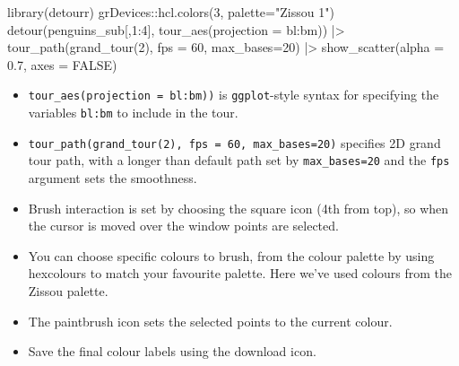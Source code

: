 \documentclass[
  letterpaper,
]{krantz}
\newenvironment{Shaded}{\begin{snugshade}}{\end{snugshade}}
\newcommand{\AttributeTok}[1]{\textcolor[rgb]{0.40,0.45,0.13}{#1}}
\newcommand{\ConstantTok}[1]{\textcolor[rgb]{0.56,0.35,0.01}{#1}}
\newcommand{\DecValTok}[1]{\textcolor[rgb]{0.68,0.00,0.00}{#1}}
\newcommand{\FloatTok}[1]{\textcolor[rgb]{0.68,0.00,0.00}{#1}}
\newcommand{\FunctionTok}[1]{\textcolor[rgb]{0.28,0.35,0.67}{#1}}
\newcommand{\NormalTok}[1]{\textcolor[rgb]{0.00,0.23,0.31}{#1}}
\newcommand{\SpecialCharTok}[1]{\textcolor[rgb]{0.37,0.37,0.37}{#1}}
\newcommand{\StringTok}[1]{\textcolor[rgb]{0.13,0.47,0.30}{#1}}
\providecommand{\tightlist}{%
  \setlength{\itemsep}{0pt}\setlength{\parskip}{0pt}}\usepackage{longtable,booktabs,array}
\begin{document}
\begin{Shaded}
\begin{Highlighting}[]
\FunctionTok{library}\NormalTok{(detourr)}
\NormalTok{grDevices}\SpecialCharTok{::}\FunctionTok{hcl.colors}\NormalTok{(}\DecValTok{3}\NormalTok{, }\AttributeTok{palette=}\StringTok{"Zissou 1"}\NormalTok{)}
\FunctionTok{detour}\NormalTok{(penguins\_sub[,}\DecValTok{1}\SpecialCharTok{:}\DecValTok{4}\NormalTok{], }
       \FunctionTok{tour\_aes}\NormalTok{(}\AttributeTok{projection =}\NormalTok{ bl}\SpecialCharTok{:}\NormalTok{bm)) }\SpecialCharTok{|\textgreater{}}
       \FunctionTok{tour\_path}\NormalTok{(}\FunctionTok{grand\_tour}\NormalTok{(}\DecValTok{2}\NormalTok{), }\AttributeTok{fps =} \DecValTok{60}\NormalTok{, }
                 \AttributeTok{max\_bases=}\DecValTok{20}\NormalTok{) }\SpecialCharTok{|\textgreater{}}
       \FunctionTok{show\_scatter}\NormalTok{(}\AttributeTok{alpha =} \FloatTok{0.7}\NormalTok{, }
                    \AttributeTok{axes =} \ConstantTok{FALSE}\NormalTok{)}
\end{Highlighting}
\end{Shaded}

\begin{itemize}
\tightlist
\item
  \texttt{tour\_aes(projection\ =\ bl:bm))} is \texttt{ggplot}-style
  syntax for specifying the variables \texttt{bl:bm} to include in the
  tour.
\item
  \texttt{tour\_path(grand\_tour(2),\ fps\ =\ 60,\ max\_bases=20)}
  specifies 2D grand tour path, with a longer than default path set by
  \texttt{max\_bases=20} and the \texttt{fps} argument sets the
  smoothness.
\item
  Brush interaction is set by choosing the square icon (4th from top),
  so when the cursor is moved over the window points are selected.
\item
  You can choose specific colours to brush, from the colour palette by
  using hexcolours to match your favourite palette. Here we've used
  colours from the Zissou palette.
\item
  The paintbrush icon sets the selected points to the current colour.
\item
  Save the final colour labels using the download icon.
\end{itemize}
\end{document}
